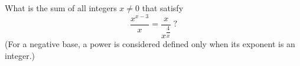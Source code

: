 What is the sum of all integers $x\ne0$ that satisfy
\[\dfrac{x^{x-3}}{x}=\dfrac{x}{x^{\dfrac{4}{x}}}\ ?\]
(For a negative base, a power is considered defined only when its exponent is an integer.)
